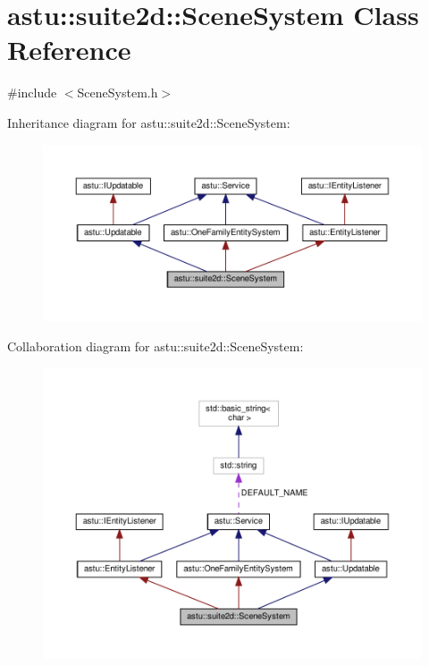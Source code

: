 \hypertarget{classastu_1_1suite2d_1_1SceneSystem}{}\section{astu\+:\+:suite2d\+:\+:Scene\+System Class Reference}
\label{classastu_1_1suite2d_1_1SceneSystem}


{\ttfamily \#include $<$Scene\+System.\+h$>$}



Inheritance diagram for astu\+:\+:suite2d\+:\+:Scene\+System\+:\nopagebreak
\begin{figure}[H]
\begin{center}
\leavevmode
\includegraphics[width=350pt]{classastu_1_1suite2d_1_1SceneSystem__inherit__graph}
\end{center}
\end{figure}


Collaboration diagram for astu\+:\+:suite2d\+:\+:Scene\+System\+:\nopagebreak
\begin{figure}[H]
\begin{center}
\leavevmode
\includegraphics[width=350pt]{classastu_1_1suite2d_1_1SceneSystem__coll__graph}
\end{center}
\end{figure}
